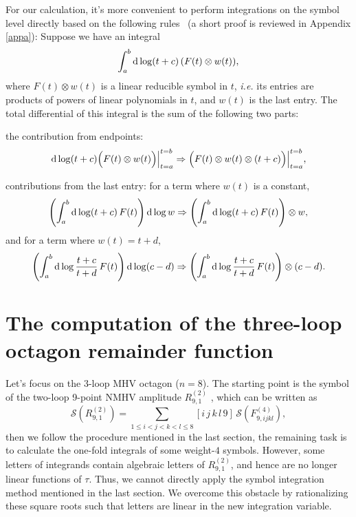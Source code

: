 \documentclass[a4paper,12pt]{article}
\begin{document}
For our calculation, it's more convenient to perform integrations on the symbol level directly based on the following rules~\cite{CaronHuot:2011kk} (a short proof is reviewed in Appendix \ref{appa}): Suppose we have an integral
\[
\int_a^b {\rm d}\log(t+c)\, (F(t)\otimes w(t)),
\]
where $F(t)\otimes w(t)$ is a linear reducible symbol in $t$, {\it i.e.} its entries are products of powers of linear polynomials in $t$, and $w(t)$ is the last entry. The total differential of this integral is the sum of the following two parts:
\begin{compactenum}[\quad (1)]
\item the contribution from endpoints:
\begin{equation}
    {\rm d}\log(t+c)\Bigl(F(t)\otimes w(t)\Bigr)\Bigr|_{t=a}^{t=b} \Rightarrow \Bigl(F(t)\otimes w(t)\otimes (t+c)\Bigl)\Bigr|_{t=a}^{t=b}, \label{symbolint1}
\end{equation}
\item contributions from the last entry: for a term where $w(t)$ is a constant,
\begin{equation}
\left(\int_a^b {\rm d}\log(t+c)\, F(t)\right){\rm d}\log w \Rightarrow\left(\int_a^b {\rm d}\log(t+c)\, F(t)\right)\otimes w, \label{symbolint2}
\end{equation}
and for a term where $w(t)=t+d$,
\begin{equation}
\left(\int_a^b {\rm d}\log \frac{t+c}{t+d}\, F(t)\right){\rm d}\log (c-d)
 \Rightarrow\left(\int_a^b {\rm d}\log \frac{t+c}{t+d}\, F(t)\right)\otimes (c-d). \label{symbolint3}
\end{equation}
\end{compactenum}

\section{The computation of the three-loop octagon remainder function} \label{sec:3} 

Let's focus on the 3-loop MHV octagon ($n=8$). The starting point is the symbol of the two-loop 9-point NMHV amplitude $R_{9,1}^{(2)}$ \cite{He:2020vob}, which can be written as 
\begin{equation*}
   \mathcal S(R_{9,1}^{(2)})= \sum_{1\leq i<j<k<l\leq 8} [i\,j\,k\,l\, 9] \,\mathcal S(F^{(4)}_{9,ijkl}),
\end{equation*} 
then we follow the procedure mentioned in the last section, the remaining task is to calculate the one-fold integrals of some weight-$4$ symbols. However, some letters of integrands contain algebraic letters of $R_{9,1}^{(2)}$, and hence are no longer linear functions of $\tau$. Thus, we cannot directly apply the symbol integration method mentioned in the last section. We overcome this obstacle by rationalizing these square roots such that letters are linear in the new integration variable.
\end{document}
